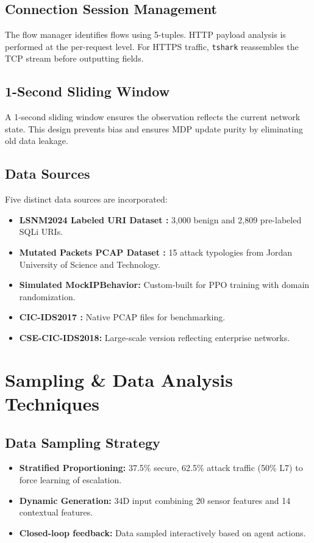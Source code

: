 \documentclass[12pt,a4paper]{report}
\begin{document}
\subsection{Connection Session Management}

The flow manager identifies flows using 5-tuples. HTTP payload analysis is performed at the per-request level. For HTTPS traffic, \texttt{tshark} reassembles the TCP stream before outputting fields.

\subsection{1-Second Sliding Window}

A 1-second sliding window ensures the observation reflects the current network state. This design prevents bias and ensures MDP update purity by eliminating old data leakage.

\subsection{Data Sources}

Five distinct data sources are incorporated:
\begin{itemize}
    \item \textbf{LSNM2024 Labeled URI Dataset \cite{lsnm2024}:} 3,000 benign and 2,809 pre-labeled SQLi URIs.
    \item \textbf{Mutated Packets PCAP Dataset \cite{abuAlHaija2025}:} 15 attack typologies from Jordan University of Science and Technology.
    \item \textbf{Simulated MockIPBehavior:} Custom-built for PPO training with domain randomization.
    \item \textbf{CIC-IDS2017 \cite{panigrahi2018detailed}:} Native PCAP files for benchmarking.
    \item \textbf{CSE-CIC-IDS2018:} Large-scale version reflecting enterprise networks.
\end{itemize}

\section{Sampling \& Data Analysis Techniques}

\subsection{Data Sampling Strategy}

\begin{itemize}
    \item \textbf{Stratified Proportioning:} 37.5\% secure, 62.5\% attack traffic (50\% L7) to force learning of escalation.
    \item \textbf{Dynamic Generation:} 34D input combining 20 sensor features and 14 contextual features.
    \item \textbf{Closed-loop feedback:} Data sampled interactively based on agent actions.
\end{itemize}
\end{document}
